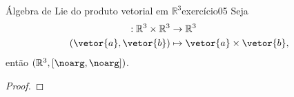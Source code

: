 \begin{proposition}{Álgebra de Lie do produto vetorial em \(\mathbb{R}^3\)}{exercício05}
    Seja
    \begin{align*}
        [\noarg, \noarg] : \mathbb{R}^3 \times \mathbb{R}^3 &\to \mathbb{R}^3\\
                                      (\vetor{a},\vetor{b}) &\mapsto \vetor{a}\times \vetor{b},
    \end{align*}
    então \((\mathbb{R}^3, [\noarg, \noarg])\).
\end{proposition}
\begin{proof}
\end{proof}
